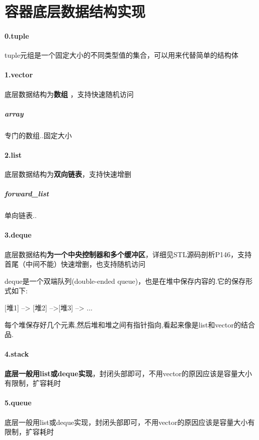 \documentclass[UTF8,a4paper,12pt]{ctexbook}
\begin{document}
			
	\section{容器底层数据结构实现}
		 \paragraph{0.tuple}    
		 	tuple元组是一个固定大小的不同类型值的集合，可以用来代替简单的结构体
	 
		 \paragraph{1.vector}     
		 	底层数据结构为\textbf{数组} ，支持快速随机访问
		 	
			 \subparagraph{array}  
			 	专门的数组..固定大小
		 
		 \paragraph{2.list}
		 	底层数据结构为\textbf{双向链表}，支持快速增删
		 	
			 \subparagraph{forward\_list} 
			 	单向链表..
		 
		 \paragraph{3.deque}       
		 	底层数据结构\textbf{为一个中央控制器和多个缓冲区}，详细见STL源码剖析P146，支持首尾（中间不能）快速增删，也支持随机访问
		 
			 deque是一个双端队列(double-ended queue)，也是在堆中保存内容的.它的保存形式如下:
			 
			 [堆1] --> [堆2] -->[堆3] --> ...
			 
			 每个堆保存好几个元素,然后堆和堆之间有指针指向,看起来像是list和vector的结合品.
		 
		 
		 \paragraph{4.stack}         
		 	\textbf{底层一般用list或deque实现}，封闭头部即可，不用vector的原因应该是容量大小有限制，扩容耗时
		 
		 \paragraph{5.queue}     
		 	底层一般用list或deque实现，封闭头部即可，不用vector的原因应该是容量大小有限制，扩容耗时
		 
\end{document}
